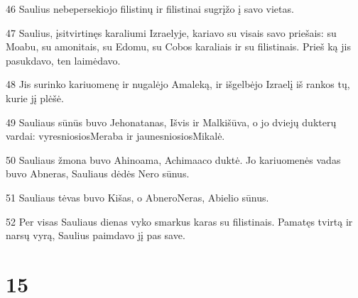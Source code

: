 \par 46 Saulius nebepersekiojo filistinų ir filistinai sugrįžo į savo vietas. 
\par 47 Saulius, įsitvirtinęs karaliumi Izraelyje, kariavo su visais savo priešais: su Moabu, su amonitais, su Edomu, su Cobos karaliais ir su filistinais. Prieš ką jis pasukdavo, ten laimėdavo. 
\par 48 Jis surinko kariuomenę ir nugalėjo Amaleką, ir išgelbėjo Izraelį iš rankos tų, kurie jį plėšė. 
\par 49 Sauliaus sūnūs buvo Jehonatanas, Išvis ir Malkišūva, o jo dviejų dukterų vardai: vyresniosios­Meraba ir jaunesniosios­Mikalė. 
\par 50 Sauliaus žmona buvo Ahinoama, Achimaaco duktė. Jo kariuomenės vadas buvo Abneras, Sauliaus dėdės Nero sūnus. 
\par 51 Sauliaus tėvas buvo Kišas, o Abnero­Neras, Abielio sūnus. 
\par 52 Per visas Sauliaus dienas vyko smarkus karas su filistinais. Pamatęs tvirtą ir narsų vyrą, Saulius paimdavo jį pas save.



\chapter{15}



